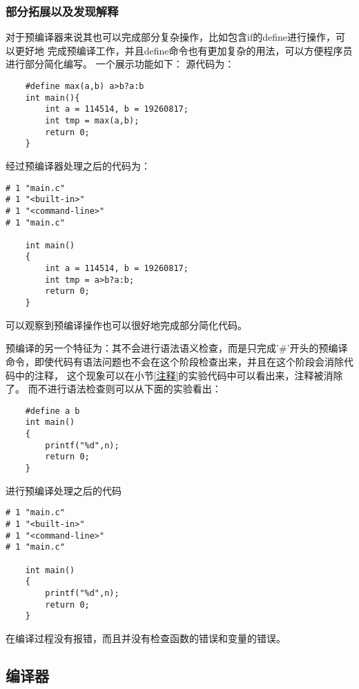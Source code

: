\documentclass[UTF8]{ctexart}
\begin{document}
\subsubsection{部分拓展以及发现解释}
对于预编译器来说其也可以完成部分复杂操作，比如包含if的define进行操作，可以更好地
完成预编译工作，并且define命令也有更加复杂的用法，可以方便程序员进行部分简化编写。
一个展示功能如下：
源代码为：
\begin{lstlisting}
    #define max(a,b) a>b?a:b
    int main(){
        int a = 114514, b = 19260817;
        int tmp = max(a,b);
        return 0;
    }
\end{lstlisting}
经过预编译器处理之后的代码为：
\begin{lstlisting}
# 1 "main.c"
# 1 "<built-in>"
# 1 "<command-line>"
# 1 "main.c"

    int main()
    {
        int a = 114514, b = 19260817;
        int tmp = a>b?a:b;
        return 0;
    }

\end{lstlisting}
可以观察到预编译操作也可以很好地完成部分简化代码。

预编译的另一个特征为：其不会进行语法语义检查，而是只完成'\#'开头的预编译
命令，即使代码有语法问题也不会在这个阶段检查出来，并且在这个阶段会消除代码中的注释，
这个现象可以在小节{\ref{注释}}的实验代码中可以看出来，注释被消除了。
而不进行语法检查则可以从下面的实验看出：
\begin{lstlisting}
    #define a b
    int main()
    {
        printf("%d",n);
        return 0;
    }

\end{lstlisting}
进行预编译处理之后的代码
\begin{lstlisting}
# 1 "main.c"
# 1 "<built-in>"
# 1 "<command-line>"
# 1 "main.c"

    int main()
    {
        printf("%d",n);
        return 0;
    }

\end{lstlisting}
在编译过程没有报错，而且并没有检查函数的错误和变量的错误。

\subsection{编译器}
\end{document}
